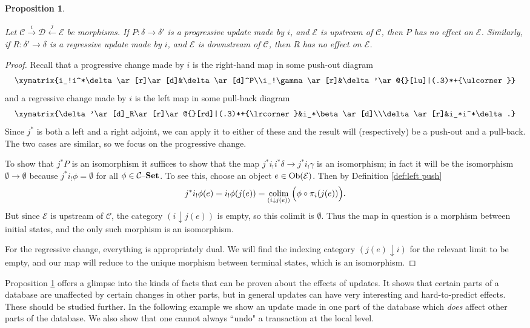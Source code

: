 \documentclass{amsart}
\makeatletter
\def\tn{\textnormal}
\def\mc{\mathcal}
\def\Ob{\tn{Ob}}
\def\to{\rightarrow}
\def\taking{\colon}
\def\down{\downarrow}
\def\ullimit{\ar@{}[rd]|(.3)*+{\lrcorner}}
\def\lrlimit{\ar@{}[lu]|(.3)*+{\ulcorner}}
\newcommand{\To}[1]{\xrightarrow{#1}}
\newcommand{\From}[1]{\xleftarrow{#1}}
\def\set{{\text \textendash}{\bf Set}}
\def\colim{\mathop{\tn{colim}}}
\def\mcC{\mc{C}}
\def\mcD{\mc{D}}
\def\mcE{\mc{E}}
\newtheorem{proposition}[theorem]{Proposition}
\theoremstyle{remark}
\theoremstyle{definition}
\makeatother
\begin{document}
\begin{proposition}\label{prop:upstream downstream}

Let $\mcC\To{i}\mcD\From{j}\mcE$ be morphisms.  If $P\taking\delta\to\delta'$ is a progressive update made by $i$, and $\mcE$ is upstream of $\mcC$, then $P$ has no effect on $\mcE$.  Similarly, if $R\taking\delta'\to\delta$ is a regressive update made by $i$, and $\mcE$ is downstream of $\mcC$, then $R$ has no effect on $\mcE$.

\end{proposition}

\begin{proof}

Recall that a progressive change made by $i$ is the right-hand map in some push-out diagram $$\xymatrix{i_!i^*\delta\ar[r]\ar[d]&\delta\ar[d]^P\\i_!\gamma\ar[r]&\delta'\lrlimit}$$ and a regressive change made by $i$ is the left map in some pull-back diagram $$\xymatrix{\delta'\ar[d]_R\ar[r]\ullimit&i_*\beta\ar[d]\\\delta\ar[r]&i_*i^*\delta.}$$  Since $j^*$ is both a left and a right adjoint, we can apply it to either of these and the result will (respectively) be a push-out and a pull-back.  The two cases are similar, so we focus on the progressive change.

To show that $j^*P$ is an isomorphism it suffices to show that the map $j^*i_!i^*\delta\to j^*i_!\gamma$ is an isomorphism; in fact it will be the isomorphism $\emptyset\to\emptyset$ because $j^*i_!\phi=\emptyset$ for all $\phi\in\mcC\set$.  To see this, choose an object $e\in\Ob(\mcE)$.  Then by Definition \ref{def:left push} $$j^*i_!\phi(e)=i_!\phi(j(e))=\colim_{(i\down j(e))}\Big(\phi\circ\pi_i(j(e))\Big).$$  But since $\mcE$ is upstream of $\mcC$, the category $(i\down j(e))$ is empty, so this colimit is $\emptyset$.  Thus the map in question is a morphism between initial states, and the only such morphism is an isomorphism. 

For the regressive change, everything is appropriately dual.  We will find the indexing category $(j(e)\down i)$ for the relevant limit to be empty, and our map will reduce to the unique morphism between terminal states, which is an isomorphism.

\end{proof}

Proposition \ref{prop:upstream downstream} offers a glimpse into the kinds of facts that can be proven about the effects of updates.  It shows that certain parts of a database are unaffected by certain changes in other parts, but in general updates can have very interesting and hard-to-predict effects.  These should be studied further.  In the following example we show an update made in one part of the database which {\em does} affect other parts of the database.  We also show that one cannot always ``undo" a transaction at the local level.
\end{document}
